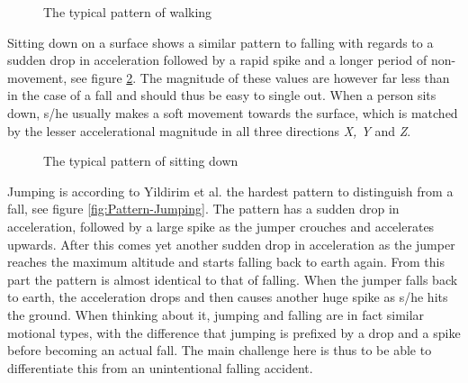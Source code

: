 \documentclass[12pt, a4paper, onecolumn]{article}
\begin{document}
	\begin{figure}[H]
		\centering
		\caption{The typical pattern of walking}%
		\label{fig:Pattern-Walking}%
	\end{figure}
	
	
	 Sitting down on a surface shows a similar pattern to falling with regards to a sudden drop in acceleration followed by a rapid spike and a longer period of non-movement, see figure \ref{fig:Pattern-Sittin}. The magnitude of these values are however far less than in the case of a fall and should thus be easy to single out. When a person sits down, s/he usually makes a soft movement towards the surface, which is matched by the lesser accelerational  magnitude in all three directions \textit{X, Y} and \textit{Z}.
	 
	 \begin{figure}[H]
	 	\centering
	 	\caption{The typical pattern of sitting down}%
	 	\label{fig:Pattern-Sittin}%
	 \end{figure}
	
	Jumping is according to Yildirim et al. the hardest pattern to distinguish from a fall, see figure \ref{fig:Pattern-Jumping}. The pattern has a sudden drop in acceleration, followed by a large spike as the jumper crouches and accelerates upwards. After this comes yet another sudden drop in acceleration as the jumper reaches the maximum altitude and starts falling back to earth again. From this part the pattern is almost identical to that of falling. When the jumper falls back to earth, the acceleration drops and then causes another huge spike as s/he hits the ground. When thinking about it, jumping and falling are in fact similar motional types, with the difference that jumping is prefixed by a drop and a spike before becoming an actual fall. The main challenge here is thus to be able to differentiate this from an unintentional falling accident.
	
\end{document}
